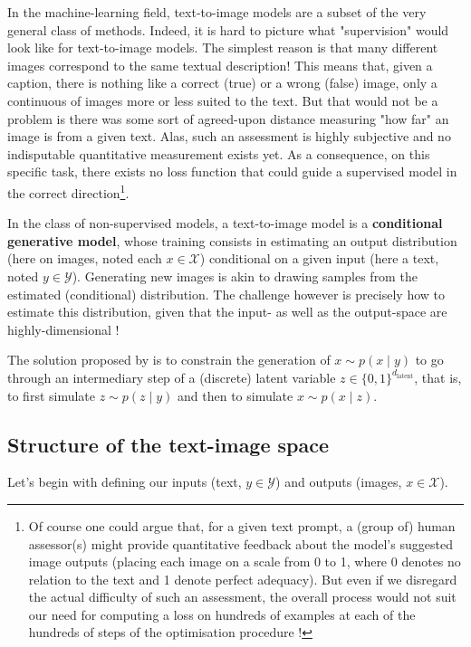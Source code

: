 \documentclass{article}
\begin{document}
\begin{appendix}
In the machine-learning field, text-to-image models are a subset of the very general class of  methods.
Indeed, it is hard to picture what "supervision" would look like for text-to-image models.
The simplest reason is that many different images correspond to the same textual description!
This means that, given a caption, there is nothing like a correct (true) or a wrong (false) image, only a continuous of images more or less suited to the text.
But that would not be a problem is there was some sort of agreed-upon distance measuring "how far" an image is from a given text.
Alas, such an assessment is highly subjective and no indisputable quantitative measurement exists yet.
As a consequence, on this specific task, there exists no loss function that could guide a supervised model in the correct direction\footnote{
Of course one could argue that, for a given text prompt, a (group of) human assessor(s) might provide quantitative feedback about the model's suggested image outputs (placing each image on a scale from 0 to 1, where 0 denotes no relation to the text and 1 denote perfect adequacy).
But even if we disregard the actual difficulty of such an assessment, the overall process would not suit our need for computing a loss on hundreds of examples at each of the hundreds of steps of the optimisation procedure !
}.

In the class of non-supervised models, a text-to-image model is a \textbf{conditional generative model}, whose training consists in estimating an output distribution (here on images, noted each $x\in\mathcal{X}$) conditional on a given input (here a text, noted $y\in\mathcal{Y}$).
Generating new images is akin to drawing samples from the estimated (conditional) distribution.
The challenge however is precisely how to estimate this distribution, given that the input- as well as the output-space are highly-dimensional !

The solution proposed by \citet{zeroshot} is to constrain the generation of $x \sim p(x\mid y)$ to go through an intermediary step of a (discrete) latent variable $z \in \{0,1\}^{d_\text{latent}}$, that is, to first simulate $z \sim p(z \mid y)$ and then to simulate $x \sim p(x \mid z)$.

\subsection{Structure of the text-image space}

Let's begin with defining our inputs (text, $y \in \mathcal{Y}$) and outputs (images, $x\in\mathcal{X}$).


\end{appendix}
\end{document}
